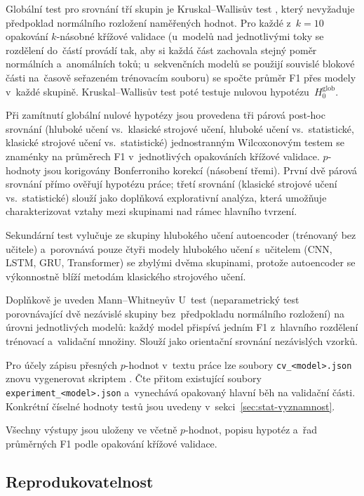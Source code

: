 Globální test pro srovnání tří skupin je Kruskal--Wallisův test \parencite{Kruskal1952}, který nevyžaduje předpoklad normálního rozložení naměřených hodnot. Pro každé z~$k=10$ opakování $k$-násobné křížové validace (u~modelů nad jednotlivými toky se rozdělení do~částí provádí tak, aby si každá část zachovala stejný poměr normálních a~anomálních toků; u~sekvenčních modelů se použijí souvislé blokové části na~časově seřazeném trénovacím souboru) se spočte průměr F1 přes modely v~každé skupině. Kruskal--Wallisův test poté testuje nulovou hypotézu~$H_0^{\mathrm{glob}}$.

Při zamítnutí globální nulové hypotézy jsou provedena tři párová post-hoc srovnání (hluboké učení vs.~klasické strojové učení, hluboké učení vs.~statistické, klasické strojové učení vs.~statistické) jednostranným Wilcoxonovým testem se znaménky na průměrech F1 v~jednotlivých opakováních křížové validace. $p$-hodnoty jsou korigovány Bonferroniho korekcí (násobení třemi). První dvě párová srovnání přímo ověřují hypotézu práce; třetí srovnání (klasické strojové učení vs.~statistické) slouží jako doplňková explorativní analýza, která umožňuje charakterizovat vztahy mezi skupinami nad rámec hlavního tvrzení.

Sekundární test vylučuje ze skupiny hlubokého učení autoencoder (trénovaný bez učitele) a~porovnává pouze čtyři modely hlubokého učení s~učitelem (CNN, LSTM, GRU, Transformer) se zbylými dvěma skupinami, protože autoencoder se výkonnostně blíží metodám klasického strojového učení.

Doplňkově je uveden Mann--Whitneyův U~test (neparametrický test porovnávající dvě nezávislé skupiny bez~předpokladu normálního rozložení) na úrovni jednotlivých modelů: každý model přispívá jedním F1 z~hlavního rozdělení trénovací a~validační množiny. Slouží jako orientační srovnání nezávislých vzorků.

Pro účely zápisu přesných $p$-hodnot v~textu práce lze soubory \texttt{cv\_<model>.json} znovu vygenerovat skriptem .
Čte přitom existující soubory \texttt{experiment\_<model>.json} a~vynechává opakovaný hlavní běh na validační části.
Konkrétní číselné hodnoty testů jsou uvedeny v~sekci~\ref{sec:stat-vyznamnost}.

Všechny výstupy jsou uloženy ve  včetně $p$-hodnot, popisu hypotéz a~řad průměrných F1 podle opakování křížové validace.

\subsection{Reprodukovatelnost}
\label{sec:reprodukovatelnost}

